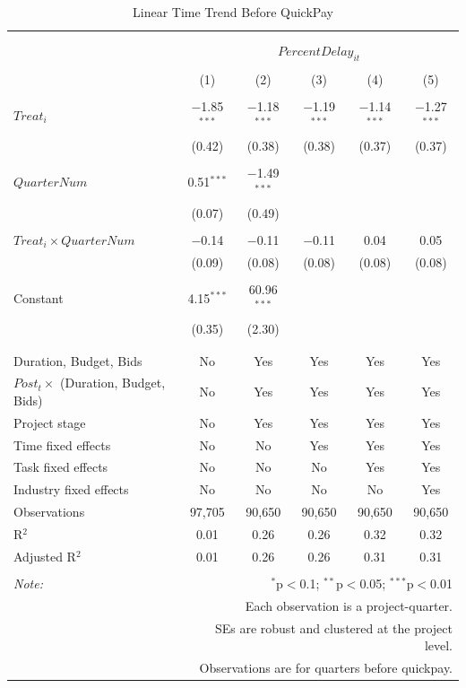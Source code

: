 \documentclass[
]{article}
\begin{document}
\begin{table}[H] \centering 
  \caption{Linear Time Trend Before QuickPay} 
  \label{} 
\small 
\begin{tabular}{@{\extracolsep{-2pt}}lccccc} 
\\[-1.8ex]\hline 
\hline \\[-1.8ex] 
\\[-1.8ex] & \multicolumn{5}{c}{$PercentDelay_{it}$} \\ 
\\[-1.8ex] & (1) & (2) & (3) & (4) & (5)\\ 
\hline \\[-1.8ex] 
 $Treat_i$ & $-$1.85$^{***}$ & $-$1.18$^{***}$ & $-$1.19$^{***}$ & $-$1.14$^{***}$ & $-$1.27$^{***}$ \\ 
  & (0.42) & (0.38) & (0.38) & (0.37) & (0.37) \\ 
  & & & & & \\ 
 $QuarterNum$ & 0.51$^{***}$ & $-$1.49$^{***}$ &  &  &  \\ 
  & (0.07) & (0.49) &  &  &  \\ 
  & & & & & \\ 
 $Treat_i \times QuarterNum$ & $-$0.14 & $-$0.11 & $-$0.11 & 0.04 & 0.05 \\ 
  & (0.09) & (0.08) & (0.08) & (0.08) & (0.08) \\ 
  & & & & & \\ 
 Constant & 4.15$^{***}$ & 60.96$^{***}$ &  &  &  \\ 
  & (0.35) & (2.30) &  &  &  \\ 
  & & & & & \\ 
\hline \\[-1.8ex] 
Duration, Budget, Bids & No & Yes & Yes & Yes & Yes \\ 
$Post_t \times$  (Duration, Budget, Bids) & No & Yes & Yes & Yes & Yes \\ 
Project stage & No & Yes & Yes & Yes & Yes \\ 
Time fixed effects & No & No & Yes & Yes & Yes \\ 
Task fixed effects & No & No & No & Yes & Yes \\ 
Industry fixed effects & No & No & No & No & Yes \\ 
Observations & 97,705 & 90,650 & 90,650 & 90,650 & 90,650 \\ 
R$^{2}$ & 0.01 & 0.26 & 0.26 & 0.32 & 0.32 \\ 
Adjusted R$^{2}$ & 0.01 & 0.26 & 0.26 & 0.31 & 0.31 \\ 
\hline 
\hline \\[-1.8ex] 
\textit{Note:}  & \multicolumn{5}{r}{$^{*}$p$<$0.1; $^{**}$p$<$0.05; $^{***}$p$<$0.01} \\ 
 & \multicolumn{5}{r}{Each observation is a project-quarter.} \\ 
 & \multicolumn{5}{r}{SEs are robust and clustered at the project level.} \\ 
 & \multicolumn{5}{r}{Observations are for quarters before quickpay.} \\ 
\end{tabular} 
\end{table}
\end{document}
